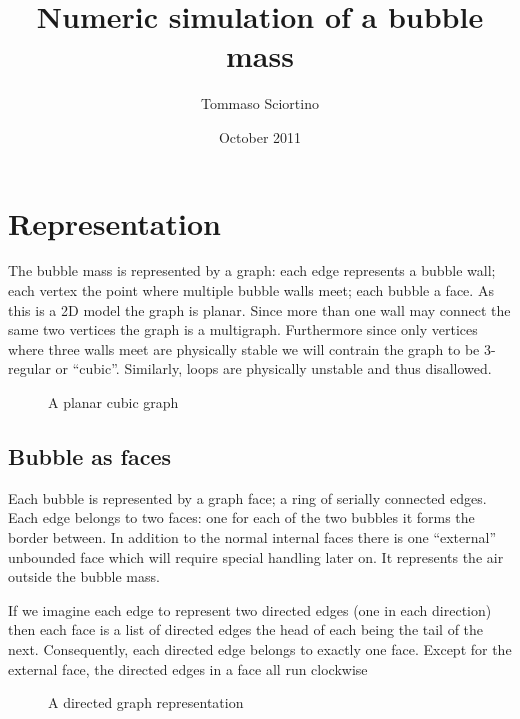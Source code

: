 \documentclass{article}
\title{Numeric simulation of a bubble mass}
\author{Tommaso Sciortino}
\date{October 2011}
\begin{document}
\maketitle
\section{Representation}
The bubble mass is represented by a graph: each edge represents a bubble wall;
each vertex the point where multiple bubble walls meet; each bubble a face. As
this is a 2D model the graph is planar. Since more than one wall may connect the same
two vertices the graph is a multigraph. Furthermore since only vertices where
three walls meet are physically stable we will contrain the graph to be
3-regular or ``cubic''. Similarly, loops are physically
unstable and thus disallowed.
\begin{figure}[h]
\centering
{}
\caption{A planar cubic graph}
\end{figure}

\subsection{Bubble as faces}
Each bubble is represented by a graph face; a ring of serially connected edges.
Each edge belongs to two faces: one for each of the two bubbles it forms the
border between. In addition to the normal internal faces there is one
``external'' unbounded face which will require special handling later on. It
represents the air outside the bubble mass.

If we imagine each edge to represent two directed edges (one in each direction)
then each face is a list of directed edges the head of each being
the tail of the next. Consequently, each directed edge belongs to exactly one
face. Except for the external face, the directed
edges in a face all run clockwise \begin{figure}[h]
\centering
{}
\caption{A directed graph representation}
\end{figure}
\end{document}
